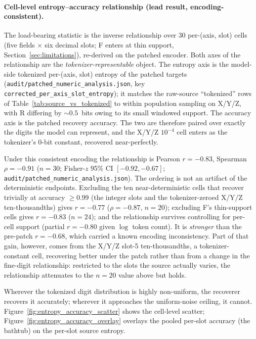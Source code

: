 \documentclass[entropy,article,submit,moreauthors,pdftex]{Definitions/mdpi}
\begin{document}
\paragraph{Cell-level entropy--accuracy relationship (lead result, encoding-consistent).} The load-bearing statistic is the inverse relationship over $30$ per-(axis, slot) cells (five fields $\times$ six decimal slots; F enters at thin support, Section~\ref{sec:limitations}), re-derived on the patched encoder. Both axes of the relationship are the \emph{tokenizer-representable} object. The entropy axis is the model-side tokenized per-(axis, slot) entropy of the patched targets (\texttt{audit/patched\_numeric\_analysis.json}, key \texttt{corrected\_per\_axis\_slot\_entropy}); it matches the raw-source ``tokenized'' rows of Table~\ref{tab:source_vs_tokenized} to within population sampling on X/Y/Z, with R differing by $\sim\!0.5$~bits owing to its small windowed support. The accuracy axis is the patched recovery accuracy. The two are therefore paired over exactly the digits the model can represent, and the X/Y/Z $10^{-4}$ cell enters as the tokenizer's $0$-bit constant, recovered near-perfectly.

Under this consistent encoding the relationship is Pearson $r=-0.83$, Spearman $\rho=-0.91$ ($n=30$; Fisher-$z$ 95\% CI $[-0.92,-0.67]$; \texttt{audit/patched\_numeric\_analysis.json}). The ordering is not an artifact of the deterministic endpoints. Excluding the ten near-deterministic cells that recover trivially at accuracy $\ge\!0.99$ (the integer slots and the tokenizer-zeroed X/Y/Z ten-thousandths) gives $r=-0.77$ ($\rho=-0.87$, $n=20$); excluding F's thin-support cells gives $r=-0.83$ ($n=24$); and the relationship survives controlling for per-cell support (partial $r=-0.80$ given $\log$ token count). It is \emph{stronger} than the pre-patch $r=-0.68$, which carried a known encoding inconsistency. Part of that gain, however, comes from the X/Y/Z slot-5 ten-thousandths, a tokenizer-constant cell, recovering better under the patch rather than from a change in the fine-digit relationship: restricted to the slots the source actually varies, the relationship attenuates to the $n=20$ value above but holds.

Wherever the tokenized digit distribution is highly non-uniform, the recoverer recovers it accurately; wherever it approaches the uniform-noise ceiling, it cannot. Figure~\ref{fig:entropy_accuracy_scatter} shows the cell-level scatter; Figure~\ref{fig:entropy_accuracy_overlay} overlays the pooled per-slot accuracy (the bathtub) on the per-slot source entropy.
\end{document}

